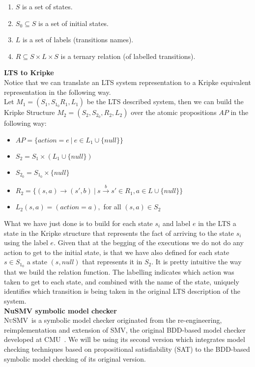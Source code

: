 \documentclass{llncs2e/llncs}
\newcommand{\nusmv}{\mbox{\textsc{NuSMV}}}
\newcommand{\ssubt}[1]{{\noindent\textbf{#1}}\enter}        %
\newcommand{\enter}{\\[0.2cm]}
\begin{document}
\begin{enumerate}%
\item $S$ is a set of states.
\item $S_0 \subseteq S$ is a set of initial states.
\item $L$ is a set of labels (transitions names).
\item $R \subseteq S \times L \times S$ is a ternary relation (of labelled transitions).
\end{enumerate}
\ssubt{LTS to Kripke}\label{lts2kripke}
Notice that we can translate an LTS system representation to a Kripke equivalent representation in the following way.\\
Let $M_1 = (S_1, S_{1_0} R_1, L_1)$ be the LTS described system, then we can build the Kripke Structure $M_2 = (S_2,S_{2_0},R_2,L_2)$ over the atomic propositions $AP$ in the following way:
\begin{itemize}
\item $ AP = \{action = e ~|~ e \in L_1 \cup \{null\}\} $
\item $ S_2 = S_1 \times (L_1 \cup \{null\}) $
\item $S_{2_0} = S_{1_0} \times \{null\}$
\item $R_2 = \{(s,a) \rightarrow (s',b) ~|~ s\overset{b}{\rightarrow}s' \in R_1, a \in L \cup \{null\}\}$
\item $L_2(s,a) = (action = a),$ for all $(s,a) \in S_2$
\end{itemize}
What we have just done is to build for each state $s_i$ and label $e$ in the LTS a state in the Kripke structure that represents the fact of arriving to the state $s_i$ using the label $e$. Given that at the begging of the executions we do not do any action to get to the initial state, is that we have also defined for each state $s \in S_{1_0}$ a state $(s,null)$ that represents it in $S_2$. It is pretty intuitive the way that we build the relation function. The labelling indicates which action was taken to get to each state, and combined with the name of the state, uniquely identifies which transition is being taken in the original LTS description of the system.\enter
\ssubt{NuSMV symbolic model checker}\label{nusmv}
\nusmv~is a symbolic model checker originated from the re-engineering,
reimplementation and extension of SMV, the original BDD-based model checker
developed at CMU~\cite{cimatti}. We will be using its second version which
integrates model checking techniques based on propositional satisfiability
(SAT) to the BDD-based symbolic model checking of its original version.\\
\end{document}

